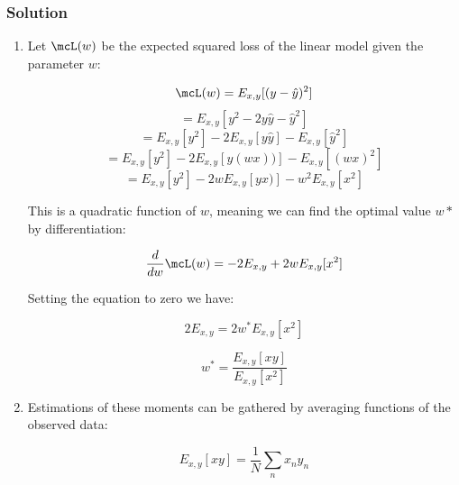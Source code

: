 \documentclass[submit]{harvardml}
\begin{document}
\newpage
\subsubsection*{Solution}

\begin{enumerate}

\item Let $\mcL(w)$ be the expected squared loss of the linear model given
the parameter $w$:

\begin{equation*}
    \mcL(w) = E_{x,y}[(y-\hat{y})^2]
\end{equation*}
\begin{equation*}
    = E_{x,y}[y^2 - 2y\hat{y} -\hat{y}^2]
\end{equation*}
\begin{equation*}
    = E_{x,y}[y^2] - 2E_{x,y}[y\hat{y}] - E_{x,y}[\hat{y}^2]
\end{equation*}
\begin{equation*}
    = E_{x,y}[y^2] - 2E_{x,y}[y(wx))] - E_{x,y}[(wx)^2]
\end{equation*}
\begin{equation*}
    = E_{x,y}[y^2] - 2wE_{x,y}[yx)] - w^2E_{x,y}[x^2]
\end{equation*}

This is a quadratic function of $w$, meaning we can find the optimal value $w*$
by differentiation:

\begin{equation*}
    \frac{d}{dw} \mcL(w) = -2E_{x,y} + 2wE_{x,y}[x^2]
\end{equation*}

Setting the equation to zero we have:

\begin{equation*}
    2E_{x,y} = 2w^*E_{x,y}[x^2]
\end{equation*}

\begin{equation*}
    w^* = \frac{E_{x,y}[xy]}{E_{x,y}[x^2]}
\end{equation*}

\item

Estimations of these moments can be gathered by averaging functions of
the observed data:

\begin{equation*}
    E_{x,y}[xy] = \frac{1}{N} \sum_n x_n y_n
\end{equation*}


\end{enumerate}
\end{document}
